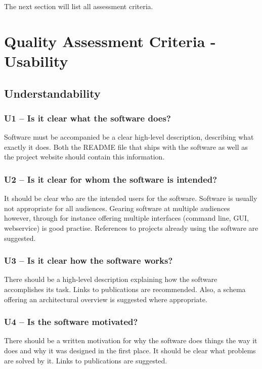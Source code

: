 \documentclass[a4paper,11pt]{article}
\begin{document}
The next section will list all assessment criteria. %

\section{Quality Assessment Criteria - Usability}

\subsection{Understandability}

\subsubsection{U1 -- Is it clear what the software does?}

Software must be accompanied be a clear high-level description, describing what
exactly it does. Both the README file that ships with the software as well as
the project website should contain this information. 

\subsubsection{U2 -- Is it clear for whom the software is intended?}

It should be clear who are the intended users for the software. Software is
usually not appropriate for all audiences. Gearing software at multiple
audiences however, through for instance offering multiple interfaces (command
line, GUI, webservice) is good practise. References to projects already using the
software are suggested.

\subsubsection{U3 -- Is it clear how the software works?}

There should be a high-level description explaining how the software
accomplishes its task. Links to publications are recommended. Also, a schema
offering an architectural overview is suggested where appropriate. 

\subsubsection{U4 -- Is the software motivated?}

There should be a written motivation for why the software does things the way
it does and why it was designed in the first place. It should be clear what
problems are solved by it. Links to publications are suggested.
\end{document}
